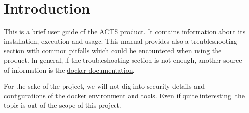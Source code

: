 \section{Introduction}\label{intro}

This is a brief user guide of the ACTS product.
It contains information about
its installation, execution and usage.
This manual provides also a troubleshooting section with common
pitfalls which could be encountered when using the product.
In general, if the troubleshooting section is not enough,
another source of information is the \href{https://docs.docker.com/engine/userguide/}{docker documentation}.

For the sake of the project, we will not dig into security details and
configurations of the docker environment and tools.
Even if quite interesting, the topic is out of the scope of this project.
